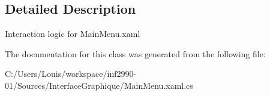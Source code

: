 \subsection{Detailed Description}
Interaction logic for Main\+Menu.\+xaml 



The documentation for this class was generated from the following file\+:\begin{DoxyCompactItemize}
\item 
C\+:/\+Users/\+Louis/workspace/inf2990-\/01/\+Sources/\+Interface\+Graphique/Main\+Menu.\+xaml.\+cs\end{DoxyCompactItemize}
